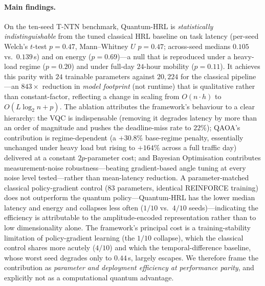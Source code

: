 \documentclass[11pt,a4paper]{article}
\theoremstyle{definition}
\begin{document}
\paragraph{Main findings.}
On the ten-seed T-NTN benchmark, Quantum-HRL is \emph{statistically indistinguishable} from the tuned classical HRL baseline on task latency (per-seed Welch's $t$-test $p=0.47$, Mann--Whitney $U$ $p=0.47$; across-seed medians $0.105$ vs.\ $0.139$\,s) and on energy ($p=0.69$)---a null that is reproduced under a heavy-load regime ($p=0.20$) and under full-day $24$-hour mobility ($p=0.11$). It achieves this parity with $24$ trainable parameters against $20{,}224$ for the classical pipeline---an $843\times$ reduction in \emph{model footprint} (not runtime) that is qualitative rather than constant-factor, reflecting a change in scaling from $O(n\cdot h)$ to $O(L\log_2 n + p)$. The ablation attributes the framework's behaviour to a clear hierarchy: the VQC is indispensable (removing it degrades latency by more than an order of magnitude and pushes the deadline-miss rate to $22\%$); QAOA's contribution is regime-dependent (a $+30.8\%$ base-regime penalty, essentially unchanged under heavy load but rising to $+164\%$ across a full traffic day) delivered at a constant $2p$-parameter cost; and Bayesian Optimisation contributes measurement-noise robustness---beating gradient-based angle tuning at every noise level tested---rather than mean-latency reduction. A parameter-matched classical policy-gradient control ($83$ parameters, identical REINFORCE training) does not outperform the quantum policy---Quantum-HRL has the lower median latency and energy and collapses less often ($1/10$ vs.\ $4/10$ seeds)---indicating the efficiency is attributable to the amplitude-encoded representation rather than to low dimensionality alone. The framework's principal cost is a training-stability limitation of policy-gradient learning (the $1/10$ collapse), which the classical control shares more acutely ($4/10$) and which the temporal-difference baseline, whose worst seed degrades only to $0.44$\,s, largely escapes. We therefore frame the contribution as \emph{parameter and deployment efficiency at performance parity}, and explicitly not as a computational quantum advantage.
\end{document}
